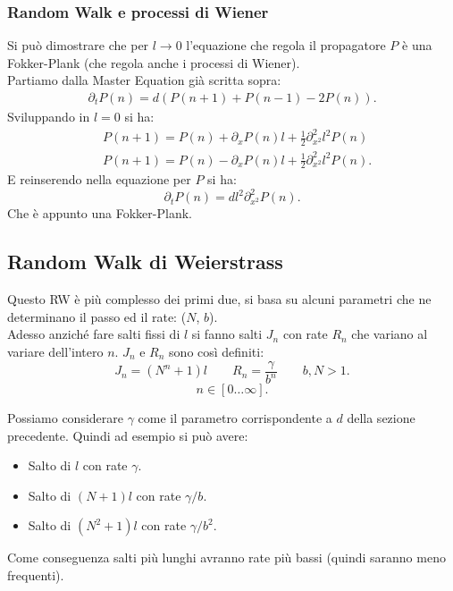 \subsubsection{Random Walk e processi di Wiener}%
\label{subsub:Random Walk e processi di Wiener}
Si può dimostrare che per $l\to 0$ l'equazione che regola il propagatore $P$ è una Fokker-Plank (che regola anche i processi di Wiener). \\
Partiamo dalla Master Equation già scritta sopra:
\[\begin{aligned}
    \partial_{t}P(n) = d\left(P(n+1) + P(n-1) -2 P(n) \right)
.\end{aligned}\]
Sviluppando in $l=0$ si ha:
\[\begin{aligned}
    &P(n+1) = P(n) + \partial_{x}P(n) l + \frac{1}{2}\partial^2_{x^2} l^2P(n) \\
    &P(n+1) = P(n) - \partial_{x}P(n) l + \frac{1}{2}\partial^2_{x^2} l^2P(n)
.\end{aligned}\]
E reinserendo nella equazione per $P$ si ha:
\[
    \partial_{t}P(n) = dl^2 \partial^2_{x^2} P(n) 
.\] 
Che è appunto una Fokker-Plank.

\subsection{Random Walk di Weierstrass}%
\label{sub:Random Walk di Weierstrass}
Questo RW è più complesso dei primi due, si basa su alcuni parametri che ne determinano il passo ed il rate: ($N$, $b$).\\
Adesso anziché fare salti fissi di $l$ si fanno salti $J_n$ con rate $R_n$ che variano al variare dell'intero $n$. $J_n$ e $R_n$ sono così definiti:
\[
    J_n = \left(N^{n}+1\right)l \qquad R_n = \frac{\gamma}{b^n} \qquad b,N > 1
.\] 
\[
    n \in \left[0\ldots\infty\right]
.\] 

Possiamo considerare $\gamma$ come il parametro corrispondente a $d$ della sezione precedente.
Quindi ad esempio si può avere:
\begin{itemize}
    \item Salto di $l$ con rate $\gamma$. 
    \item Salto di $\left(N+1\right)l$ con rate $\gamma  / b$.
    \item Salto di $\left(N^2+1\right)l$ con rate $\gamma /b^2$.
\end{itemize}
Come conseguenza salti più lunghi avranno rate più bassi (quindi saranno meno frequenti).\\
